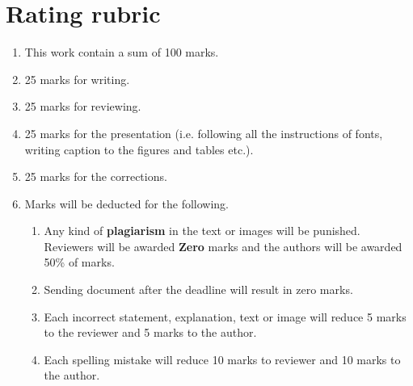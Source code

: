 \documentclass{article}
\begin{document}
{		\section{Rating rubric}
		\begin{enumerate}
			\item This work contain a sum of 100 marks.
			\item 25 marks for writing.
			\item 25 marks for reviewing.
			\item 25 marks for the presentation (i.e. following all the instructions of fonts, writing caption to the figures and tables etc.).
			\item 25 marks for the corrections.
			\item Marks will be deducted for the following.
			\begin{enumerate}
				\item Any kind of \textbf{plagiarism} in the text or images will be punished. Reviewers will be awarded \textbf{Zero} marks and the authors will be awarded 50\% of marks.
				\item Sending document after the deadline will result in zero marks.
				\item Each incorrect statement, explanation, text or image will reduce 5 marks to the reviewer and 5 marks to the author.
				\item Each spelling mistake will reduce 10 marks to reviewer and 10 marks to the author.
			\end{enumerate}
		\end{enumerate}
				
		
		\clearpage
	}
\end{document}
